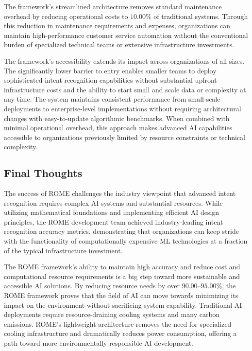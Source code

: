 \documentclass[12pt]{article}
\begin{document}
The framework's streamlined architecture removes standard maintenance overhead by reducing operational costs to $10.00\%$ of traditional systems. Through this reduction in maintenance requirements and expenses, organizations can maintain high-performance customer service automation without the conventional burden of specialized technical teams or extensive infrastructure investments.

The framework's accessibility extends its impact across organizations of all sizes. The significantly lower barrier to entry enables smaller teams to deploy sophisticated intent recognition capabilities without substantial upfront infrastructure costs and the ability to start small and scale data or complexity at any time. The system maintains consistent performance from small-scale deployments to enterprise-level implementations without requiring architectural changes with easy-to-update algorithmic benchmarks. When combined with minimal operational overhead, this approach makes advanced AI capabilities accessible to organizations previously limited by resource constraints or technical complexity.

\subsection{Final Thoughts}
The success of ROME challenges the industry viewpoint that advanced intent recognition requires complex AI systems and substantial resources. While utilizing mathematical foundations and implementing efficient AI design principles, the ROME development team achieved industry-leading intent recognition accuracy metrics, demonstrating that organizations can keep stride with the functionality of computationally expensive ML technologies at a fraction of the typical infrastructure investment.

The ROME framework's ability to maintain high accuracy and reduce cost and computational resource requirements is a big step toward more sustainable and accessible AI solutions. By reducing resource needs by over $90.00$--$95.00\%$, the ROME framework proves that the field of AI can move towards minimizing its impact on the environment without sacrificing system capability. Traditional AI deployments require resource-draining cooling systems and many carbon emissions. ROME's lightweight architecture removes the need for specialized cooling infrastructure and dramatically reduces power consumption, offering a path toward more environmentally responsible AI development.
\end{document}
